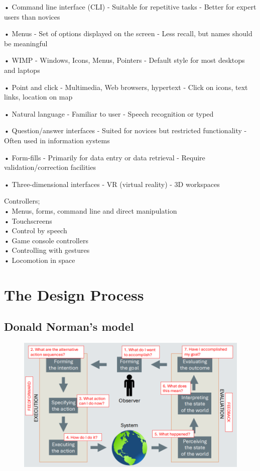\documentclass[]{project_plan}
\begin{document}
• Command line interface (CLI) - Suitable for repetitive tasks - Better for expert users than novices

• Menus - Set of options displayed on the screen - Less recall, but names should be meaningful

• WIMP - Windows, Icons, Menus, Pointers - Default style for most desktops and laptops

• Point and click - Multimedia, Web browsers, hypertext - Click on icons, text links, location on map

• Natural language - Familiar to user - Speech recognition or typed

• Question/answer interfaces - Suited for novices but restricted functionality - Often used in information systems

• Form-fills - Primarily for data entry or data retrieval - Require validation/correction facilities

• Three-dimensional interfaces - VR (virtual reality) - 3D workspaces

Controllers;\\
• Menus, forms, command line and direct manipulation\\
• Touchscreens\\
• Control by speech\\
• Game console controllers\\
• Controlling with gestures\\
• Locomotion in space

\section{The Design Process}

\subsection{Donald Norman’s model}
\begin{figure}[h!]
  \centering
  \includegraphics[width=\linewidth]{donald_norman_model.png}
\end{figure}
\end{document}
